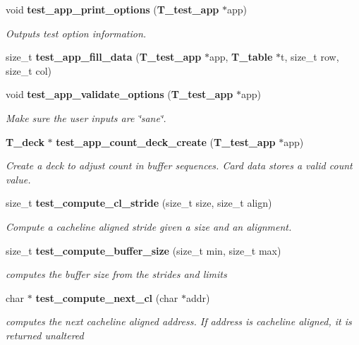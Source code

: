 \begin{CompactItemize}
void {\bf test\_\-app\_\-print\_\-options} ({\bf T\_\-test\_\-app} $\ast$app)
\begin{CompactList}\small\item\em Outputs test option information.\item\end{CompactList}\item 
size\_\-t {\bf test\_\-app\_\-fill\_\-data} ({\bf T\_\-test\_\-app} $\ast$app, {\bf T\_\-table} $\ast$t, size\_\-t row, size\_\-t col)
\item 
void {\bf test\_\-app\_\-validate\_\-options} ({\bf T\_\-test\_\-app} $\ast$app)
\begin{CompactList}\small\item\em Make sure the user inputs are \char`\"{}sane\char`\"{}.\item\end{CompactList}\item 
{\bf T\_\-deck} $\ast$ {\bf test\_\-app\_\-count\_\-deck\_\-create} ({\bf T\_\-test\_\-app} $\ast$app)
\begin{CompactList}\small\item\em Create a deck to adjust count in buffer sequences. Card data stores a valid count value.\item\end{CompactList}\item 
size\_\-t {\bf test\_\-compute\_\-cl\_\-stride} (size\_\-t size, size\_\-t align)
\begin{CompactList}\small\item\em Compute a cacheline aligned stride given a size and an alignment.\item\end{CompactList}\item 
size\_\-t {\bf test\_\-compute\_\-buffer\_\-size} (size\_\-t min, size\_\-t max)
\begin{CompactList}\small\item\em computes the buffer size from the strides and limits\item\end{CompactList}\item 
char $\ast$ {\bf test\_\-compute\_\-next\_\-cl} (char $\ast$addr)
\begin{CompactList}\small\item\em computes the next cacheline aligned address. If address is cacheline aligned, it is returned unaltered\item\end{CompactList}\item 

\end{CompactItemize}

